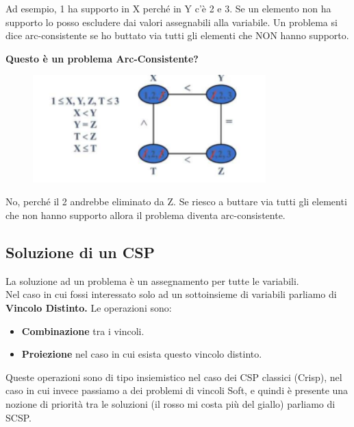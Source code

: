 Ad esempio, 1 ha supporto in X perché in Y c'è 2 e 3. Se un elemento non ha
supporto lo posso escludere dai valori assegnabili alla variabile. Un problema
si dice arc-consistente se ho buttato via tutti gli elementi che NON hanno
supporto.

\vspace{0.8cm}

\textbf{Questo è un problema Arc-Consistente?}
\begin{figure}[H]
    \centering
    \includegraphics[width=9cm, keepaspectratio]{img/Cap3/riassunto2.png}
\end{figure}

No, perché il 2 andrebbe eliminato da Z. Se riesco a buttare via tutti gli
elementi che non hanno supporto allora il problema diventa arc-consistente.

\subsection{Soluzione di un CSP}
La soluzione ad un problema è un assegnamento per tutte le variabili. \\Nel caso
in cui fossi interessato solo ad un sottoinsieme di variabili parliamo di
\textbf{Vincolo Distinto.} Le operazioni sono:
\begin{itemize}
    \item  \textbf{Combinazione} tra i vincoli.
    \item \textbf{Proiezione} nel caso in cui esista questo vincolo distinto.
\end{itemize}
Queste operazioni sono di tipo insiemistico nel caso dei CSP classici (Crisp),
nel caso in cui invece passiamo a dei problemi di vincoli Soft, e quindi è
presente una nozione di priorità tra le soluzioni (il rosso mi costa più del
giallo) parliamo di SCSP.

